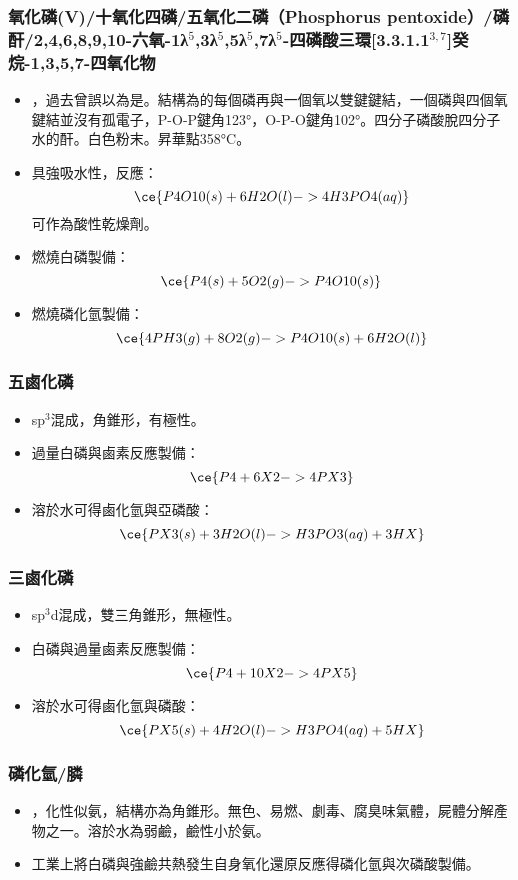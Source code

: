 \documentclass[a4paper,12pt]{report}
\begin{document}
\subsubsection{氧化磷(V)/十氧化四磷/五氧化二磷（Phosphorus pentoxide）/磷酐/2,4,6,8,9,10-六氧-1λ$^5$,3λ$^5$,5λ$^5$,7λ$^5$-四磷酸三環[3.3.1.1$^{3,7}$]癸烷-1,3,5,7-四氧化物}
\begin{itemize}
\item {}，過去曾誤以為是。結構為的每個磷再與一個氧以雙鍵鍵結，一個磷與四個氧鍵結並沒有孤電子，P-O-P鍵角123°，O-P-O鍵角102°。四分子磷酸脫四分子水的酐。白色粉末。昇華點358°C。
\item 具強吸水性，反應：
\[\ce{P4O10(s) + 6H2O(l) -> 4H3PO4(aq)}\]
可作為酸性乾燥劑。
\item 燃燒白磷製備：
\[\ce{P4(s) + 5O2(g) -> P4O10(s)}\]
\item 燃燒磷化氫製備：
\[\ce{4PH3(g) + 8O2(g) -> P4O10(s) + 6H2O(l)}\]
\end{itemize}
\subsubsection{五鹵化磷}
\begin{itemize}
\item sp$^3$混成，角錐形，有極性。
\item 過量白磷與鹵素反應製備：
\[\ce{P4 + 6X2 -> 4PX3}\]
\item 溶於水可得鹵化氫與亞磷酸：
\[\ce{PX3(s) + 3H2O(l) -> H3PO3(aq) + 3HX}\]
\end{itemize}
\subsubsection{三鹵化磷}
\begin{itemize}
\item sp$^3$d混成，雙三角錐形，無極性。
\item 白磷與過量鹵素反應製備：
\[\ce{P4 + 10X2 -> 4PX5}\]
\item 溶於水可得鹵化氫與磷酸：
\[\ce{PX5(s) + 4H2O(l) -> H3PO4(aq) + 5HX}\]
\end{itemize}
\subsubsection{磷化氫/膦}
\begin{itemize}
\item {}，化性似氨，結構亦為角錐形。無色、易燃、劇毒、腐臭味氣體，屍體分解產物之一。溶於水為弱鹼，鹼性小於氨。
\item 工業上將白磷與強鹼共熱發生自身氧化還原反應得磷化氫與次磷酸製備。
\end{itemize}
\end{document}
